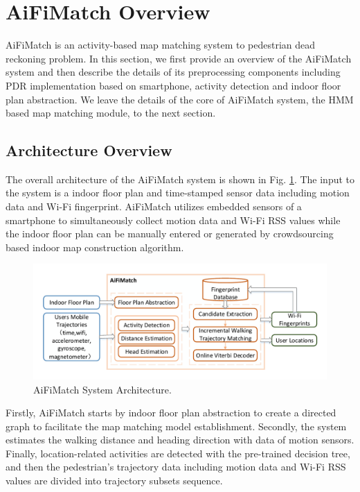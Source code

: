\documentclass{llncs}
\begin{document}
\section{AiFiMatch Overview}

AiFiMatch is an activity-based map matching system to pedestrian dead reckoning problem. In this section, we first provide an overview of the AiFiMatch system and then describe the details of its preprocessing components including PDR implementation based on smartphone, activity detection and indoor floor plan abstraction. We leave the details of the core of AiFiMatch system, the HMM based map matching module, to the next section.

\subsection{Architecture Overview}

The overall architecture of the AiFiMatch system is shown in Fig. \ref{fig-architecture}. The input to the system is a indoor floor plan and time-stamped sensor data including motion data and Wi-Fi fingerprint. AiFiMatch utilizes embedded sensors of a smartphone to simultaneously collect motion data and Wi-Fi RSS values while the indoor floor plan can be manually entered or generated by crowdsourcing based indoor map construction algorithm.

\begin{figure}[!htbp]
	\centering
	\includegraphics[width=4.65in]{AiFiMatch-Architecture}
	\caption{AiFiMatch System Architecture.}
	\label{fig-architecture}
\end{figure}

Firstly, AiFiMatch starts by indoor floor plan abstraction to create a directed graph to facilitate the map matching model establishment. Secondly, the system estimates the walking distance and heading direction with data of motion sensors. Finally, location-related activities are detected with the pre-trained decision tree, and then the pedestrian's trajectory data including motion data and Wi-Fi RSS values are divided into trajectory subsets sequence.  
\end{document}
